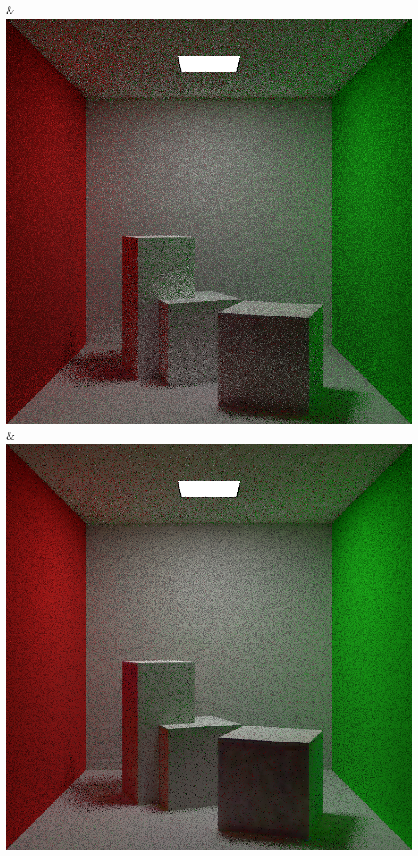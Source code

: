 & \includegraphics[width=\linewidth]{figures/py/tests/path_termination/sah_1spp.png}
& \includegraphics[width=\linewidth]{figures/py/tests/path_termination/bth_1spp.png}
